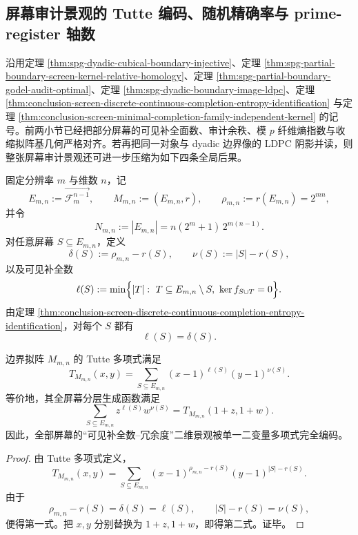 \subsection{屏幕审计景观的 Tutte 编码、随机精确率与 prime-register 轴数}\label{subsec:conclusion-screen-tutte-randomexact-prime-register-thermodynamics}
沿用定理 \ref{thm:spg-dyadic-cubical-boundary-injective}、定理 \ref{thm:spg-partial-boundary-screen-kernel-relative-homology}、定理 \ref{thm:spg-partial-boundary-godel-audit-optimal}、定理 \ref{thm:spg-dyadic-boundary-image-ldpc}、定理 \ref{thm:conclusion-screen-discrete-continuous-completion-entropy-identification} 与定理 \ref{thm:conclusion-screen-minimal-completion-family-independent-kernel} 的记号。前两小节已经把部分屏幕的可见补全面数、审计余秩、模 \(p\) 纤维熵指数与收缩拟阵基几何严格对齐。若再把同一对象与 dyadic 边界像的 LDPC 阴影并读，则整张屏幕审计景观还可进一步压缩为如下四条全局后果。

固定分辨率 \(m\) 与维数 \(n\)，记
\[
E_{m,n}:=\overrightarrow{\mathcal F_m^{n-1}},
\qquad
M_{m,n}:=(E_{m,n},r),
\qquad
\rho_{m,n}:=r(E_{m,n})=2^{mn},
\]
并令
\[
N_{m,n}:=|E_{m,n}|=n(2^m+1)\,2^{m(n-1)}.
\]
对任意屏幕 \(S\subseteq E_{m,n}\)，定义
\[
\delta(S):=\rho_{m,n}-r(S),
\qquad
\nu(S):=|S|-r(S),
\]
以及可见补全数
\[
\ell(S):=
\min\Bigl\{
|T|:\ T\subseteq E_{m,n}\setminus S,\ \ker f_{S\cup T}=0
\Bigr\}.
\]
由定理 \ref{thm:conclusion-screen-discrete-continuous-completion-entropy-identification}，对每个 \(S\) 都有
\[
\ell(S)=\delta(S).
\]

\begin{theorem}\label{thm:conclusion-screen-audit-landscape-tutte-complete-encoding}
边界拟阵 \(M_{m,n}\) 的 Tutte 多项式满足
\[
T_{M_{m,n}}(x,y)
=
\sum_{S\subseteq E_{m,n}}
(x-1)^{\ell(S)}(y-1)^{\nu(S)}.
\]
等价地，其全屏幕分层生成函数满足
\[
\sum_{S\subseteq E_{m,n}} z^{\ell(S)}w^{\nu(S)}
=
T_{M_{m,n}}(1+z,1+w).
\]
因此，全部屏幕的“可见补全数--冗余度”二维景观被单一二变量多项式完全编码。
\end{theorem}
\begin{proof}
由 Tutte 多项式定义，
\[
T_{M_{m,n}}(x,y)
=
\sum_{S\subseteq E_{m,n}}
(x-1)^{\rho_{m,n}-r(S)}(y-1)^{|S|-r(S)}.
\]
由于
\[
\rho_{m,n}-r(S)=\delta(S)=\ell(S),
\qquad
|S|-r(S)=\nu(S),
\]
便得第一式。把 \(x,y\) 分别替换为 \(1+z,1+w\)，即得第二式。证毕。
\end{proof}

